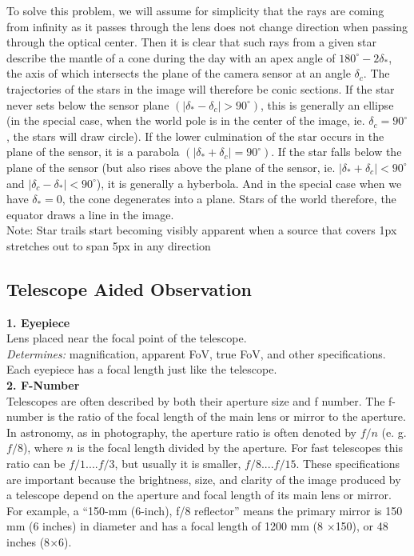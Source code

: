 \documentclass[a4paper,12pt]{extarticle}
\begin{document}
\begin{enumerate}
{\color{blue}
To solve this problem, we will assume for simplicity that the rays are coming from infinity as it passes through the lens does not change direction when passing through the optical center. Then it is clear that such rays from a given star describe the mantle of a cone during the day
with an apex angle of $180^\circ - 2\delta_\ast$, the axis of which intersects the plane of the camera sensor at an angle
$\delta_c$. The trajectories of the stars in the image will therefore be conic sections. If the star never sets
below the sensor plane $(|\delta_\ast-\delta_c|> 90^\circ)$, this is generally an ellipse (in the special case, when the world pole is in the center of the image, ie. $\delta_c = 90^\circ$, the stars will draw circle). If the lower culmination of the star occurs in the plane of the sensor, it is a parabola  $(|\delta_\ast+\delta_c|=90^\circ)$. If the star falls below the plane of the sensor (but also rises above
the plane of the sensor, ie.  $|\delta_\ast +\delta_c|< 90^\circ$ and  $|\delta_c- \delta_\ast|< 90^\circ$), it is generally a hyberbola. And in the special case when we have $\delta_\ast = 0$, the cone degenerates into a plane. Stars of the world therefore, the equator draws a line in the image.\\

Note: Star trails start becoming visibly apparent when a source that covers 1px stretches out to span 5px in any direction}
\end{enumerate}

\clearpage
\subsection{Telescope Aided Observation}
\textbf{1. Eyepiece}\\ 

Lens placed near the focal point of the telescope.\\
\textit{Determines:} magnification, apparent FoV, true FoV, and other specifications. Each eyepiece has a focal length just like the telescope.\\


\textbf{2. F-Number}\\ 

Telescopes are often described by both their aperture size and f number. The f-number is the ratio of the focal length of the main lens or mirror to the aperture. In astronomy, as in photography, the aperture ratio is often denoted by $f/n$ (e. g. $f/8$), where $n$ is the focal length divided by the aperture. For fast telescopes this ratio can be $f/1. . . . f/3$, but usually it is smaller, $f/8. . . . f/15$. These specifications are important because the brightness, size, and clarity of the image produced by a telescope depend on the aperture and focal length of its main lens or mirror. For example, a “150-mm (6-inch), f/8 reflector” means the primary mirror is 150 mm (6 inches) in diameter and has a focal length of 1200 mm (8 $\times$150), or 48 inches (8$\times$6).\\
\end{document}
